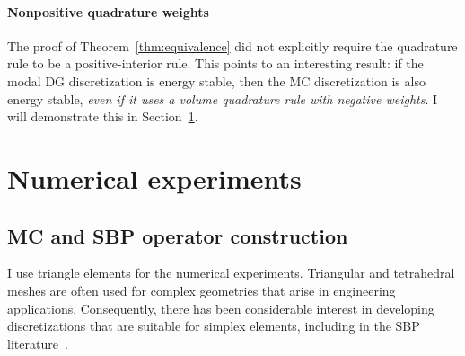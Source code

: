 \documentclass[pdflatex,sn-mathphys-num]{sn-jnl}%
\theoremstyle{thmstyleone}%
\theoremstyle{thmstyletwo}%
\theoremstyle{thmstylethree}%
\begin{document}
\paragraph{Nonpositive quadrature weights}

The proof of Theorem~\ref{thm:equivalence} did not explicitly require the quadrature rule to be a positive-interior rule.  This points to an interesting result: if the modal DG discretization is energy stable, then the MC discretization is also energy stable, \emph{even if it uses a volume quadrature rule with negative weights}.  I will demonstrate this in Section~\ref{sec:results}.

\section{Numerical experiments}\label{sec:results}

\subsection{MC and SBP operator construction}



I use triangle elements for the numerical experiments.  Triangular and tetrahedral meshes are often used for complex geometries that arise in engineering applications.  Consequently, there has been considerable interest in developing discretizations that are suitable for simplex elements, including in the SBP literature~\cite{Hicken2016multidimensional,Crean2018entropy,Chan2018discretely,Worku2025tensor,Worku2025veryhigh,Marchildon2020optimization,Montoya2024efficient}.
\end{document}
